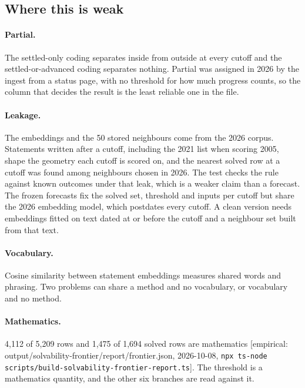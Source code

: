 \documentclass[11pt]{article}
\newcommand{\emp}[1]{\textcolor{bucketgray}{\footnotesize [empirical: #1]}}
\newcommand{\cmd}{\texttt{npx ts-node scripts/build-solvability-frontier-report.ts}}
\newcommand{\bt}{\emp{output/solvability-frontier/report/backtest.json, 2026-10-08, \cmd}}
\newcommand{\fr}{\emp{output/solvability-frontier/report/frontier.json, 2026-10-08, \cmd}}
\begin{document}
\begin{table}[htbp]
  \centering
  \caption{Frozen forecasts at three cutoffs, both codings, all scored rows \bt.}
  \label{tab:frozen}
  \small
  
\end{table}

\subsection{Where this is weak}
\label{sec:weak}

\paragraph{Partial.}
The settled-only coding separates inside from outside at every cutoff and the settled-or-advanced coding separates nothing. Partial was assigned in 2026 by the ingest from a status page, with no threshold for how much progress counts, so the column that decides the result is the least reliable one in the file.

\paragraph{Leakage.}
The embeddings and the 50 stored neighbours come from the 2026 corpus. Statements written after a cutoff, including the 2021 list when scoring 2005, shape the geometry each cutoff is scored on, and the nearest solved row at a cutoff was found among neighbours chosen in 2026. The test checks the rule against known outcomes under that leak, which is a weaker claim than a forecast. The frozen forecasts fix the solved set, threshold and inputs per cutoff but share the 2026 embedding model, which postdates every cutoff. A clean version needs embeddings fitted on text dated at or before the cutoff and a neighbour set built from that text.

\paragraph{Vocabulary.}
Cosine similarity between statement embeddings measures shared words and phrasing. Two problems can share a method and no vocabulary, or vocabulary and no method.

\paragraph{Mathematics.}
4,112 of 5,209 rows and 1,475 of 1,694 solved rows are mathematics \fr. The threshold is a mathematics quantity, and the other six branches are read against it.
\end{document}
